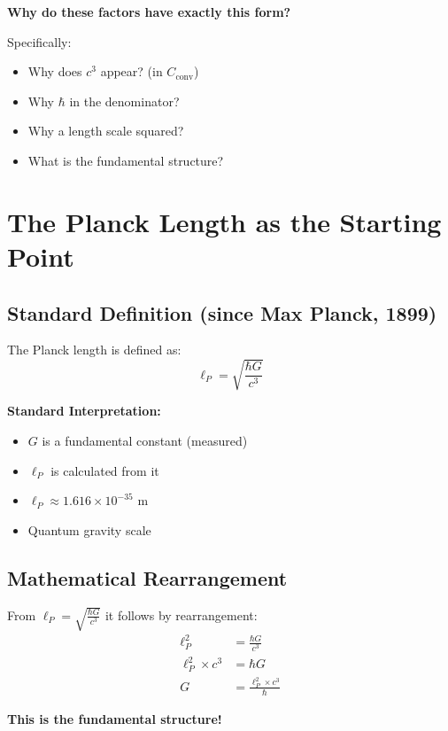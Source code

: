	\textbf{Why do these factors have exactly this form?}
	
	Specifically:
	\begin{itemize}
		\item Why does $c^3$ appear? (in $C_{\text{conv}}$)
		\item Why $\hbar$ in the denominator?
		\item Why a length scale squared?
		\item What is the fundamental structure?
	\end{itemize}
	
	\section{The Planck Length as the Starting Point}
	
	\subsection{Standard Definition (since Max Planck, 1899)}
	
	The Planck length is defined as:
	\begin{equation}
		\ell_P = \sqrt{\frac{\hbar G}{c^3}}
	\end{equation}
	
	\textbf{Standard Interpretation:}
	\begin{itemize}
		\item $G$ is a fundamental constant (measured)
		\item $\ell_P$ is calculated from it
		\item $\ell_P \approx 1.616 \times 10^{-35}$ m
		\item Quantum gravity scale
	\end{itemize}
	
	\subsection{Mathematical Rearrangement}
	
	From $\ell_P = \sqrt{\frac{\hbar G}{c^3}}$ it follows by rearrangement:
	\begin{align}
		\ell_P^2 &= \frac{\hbar G}{c^3} \\
		\ell_P^2 \times c^3 &= \hbar G \\
		G &= \frac{\ell_P^2 \times c^3}{\hbar}
	\end{align}
	
	\textbf{This is the fundamental structure!}
	
